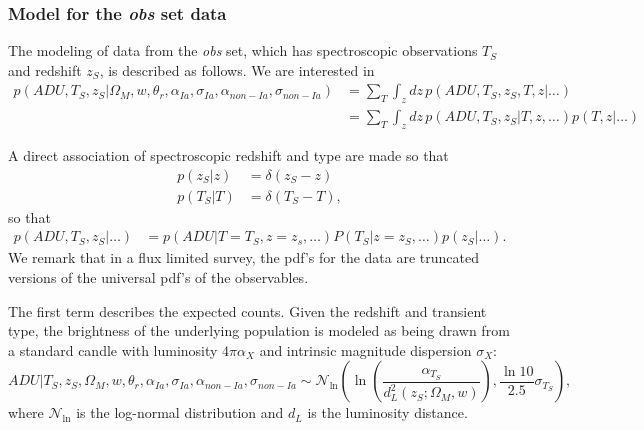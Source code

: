 \documentclass[preprint]{aastex}
\begin{document}
\subsubsection{Model for the {\it obs} set data}
The modeling of data from the {\it obs} set, which has
spectroscopic observations $T_S$ and redshift
$z_S$, is described as follows.  We are interested in
\begin{align}
p(\mathit{ADU}, {{T}}_S,{{z}}_S|  \Omega_M, w, \theta_r,\alpha_{Ia},\sigma_{Ia}, \alpha_{\mathit{non-Ia}},\sigma_{\mathit{non-Ia}})  &=\sum_T \int_z dz\,
p(\mathit{ADU}, {{T}}_S,{{z}}_S, T, z| \ldots)\\
&= \sum_T \int_z dz\,
p(\mathit{ADU}, {{T}}_S,{{z}}_S| T, z,\dots) p(T,z | \ldots)
\end{align}

A direct association of spectroscopic redshift and type are made so that
\begin{align}
p(z_S|z) &= \delta(z_S-z)\\
p(T_S|T) &= \delta(T_S-T),
\label{specz:eqn}
\end{align}
so that
\begin{align}
p(\mathit{ADU}, {{T}}_S,{{z}}_S|  \ldots) &= 
p(\mathit{ADU}| T=T_S, z=z_s,\dots) P(T_S| z= z_S , \ldots) p(z_S|\ldots).
\label{obs:eqn}
\end{align}
We remark that in a flux limited survey, the pdf's for the data are truncated versions of the universal
pdf's of the observables.

The first term describes the expected counts. Given the redshift
and transient type, the brightness of the underlying population
is modeled as being drawn from a standard candle
with luminosity $4\pi\alpha_X$ and intrinsic magnitude dispersion  $\sigma_X$:
\begin{equation}
\mathit{ADU}| T_S, z_S, \Omega_M, w, \theta_r, \alpha_{Ia},\sigma_{Ia}, \alpha_{\mathit{non-Ia}},\sigma_{\mathit{non-Ia}} \sim \mathcal{N}_{\ln}\left(\ln{\left(\frac{\alpha_{T_S}}{d_L^2(z_S;\Omega_M, w)}\right)}, \frac{\ln{10}}{2.5}\sigma_{T_S}\right),
\end{equation}
where $\mathcal{N}_{\ln}$ is the log-normal distribution and $d_L$ is the luminosity distance.
\end{document}
